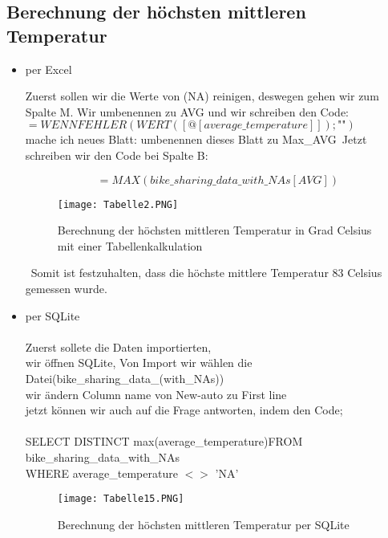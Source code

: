 \documentclass[1pt]{article}
\begin{document}
\subsection{Berechnung der höchsten mittleren Temperatur}
\begin{itemize}
\item per Excel

Zuerst sollen wir die Werte von (NA) reinigen, deswegen gehen wir zum Spalte M. Wir umbenennen zu AVG und wir schreiben den Code: 
$=WENNFEHLER(WERT([@[average\_temperature]]);\text{""})$\\
mache ich  neues Blatt: umbenennen dieses Blatt zu Max\_AVG\
Jetzt schreiben wir den Code bei Spalte B:

$$ =MAX(bike\_sharing\_data\_with\_NAs[AVG]) $$

\begin{figure}[h] %
    \centering %
    \texttt{[image: Tabelle2.PNG]} %
\caption{{\tiny Berechnung der höchsten mittleren Temperatur in Grad Celsius mit einer Tabellenkalkulation}}
   
    \label{fig:meinBild} %
\end{figure}
\vspace{1cm}\
Somit ist festzuhalten, dass die höchste mittlere Temperatur 83 Celsius gemessen wurde. 

\newpage
\item per SQLite\\
\\Zuerst sollete die Daten importierten,\\
wir öffnen SQLite, Von Import wir wählen die Datei(bike\_sharing\_data\_(with\_NAs))\\
wir ändern  Column name von New-auto zu First line\\

jetzt können wir auch auf die Frage antworten, indem den Code;\\
\\SELECT DISTINCT max(average\_temperature)FROM bike\_sharing\_data\_with\_NAs
\\WHERE average\_temperature $<>$ 'NA'


\begin{figure}[h] %
    \centering %
    \texttt{[image: Tabelle15.PNG]} %
    \caption{Berechnung der höchsten mittleren Temperatur per SQLite}
   
    \label{fig:meinBild} %
\end{figure}\\

\end{itemize}
\end{document}
